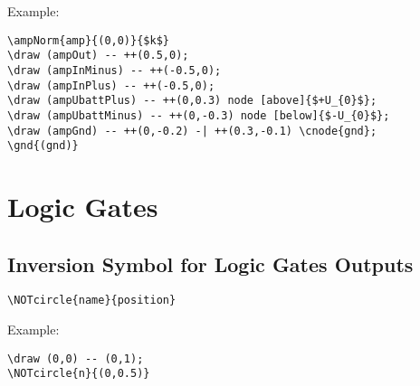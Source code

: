 \documentclass[parskip=full]{scrartcl}
\begin{document}
Example:\\
\begin{minipage}{0.8\textwidth}
\begin{verbatim}
\ampNorm{amp}{(0,0)}{$k$}
\draw (ampOut) -- ++(0.5,0);
\draw (ampInMinus) -- ++(-0.5,0);
\draw (ampInPlus) -- ++(-0.5,0);
\draw (ampUbattPlus) -- ++(0,0.3) node [above]{$+U_{0}$};
\draw (ampUbattMinus) -- ++(0,-0.3) node [below]{$-U_{0}$};
\draw (ampGnd) -- ++(0,-0.2) -| ++(0.3,-0.1) \cnode{gnd};
\gnd{(gnd)}
\end{verbatim}
\end{minipage}
\begin{minipage}{0.19\textwidth}
\end{minipage}

\section{Logic Gates}

\subsection{Inversion Symbol for Logic Gates Outputs}

\begin{verbatim}
\NOTcircle{name}{position}
\end{verbatim}

Example:\\
\begin{minipage}{0.8\textwidth}
\begin{verbatim}
\draw (0,0) -- (0,1);
\NOTcircle{n}{(0,0.5)}
\end{verbatim}
\end{minipage}
\begin{minipage}{0.19\textwidth}
\end{minipage}
\end{document}
